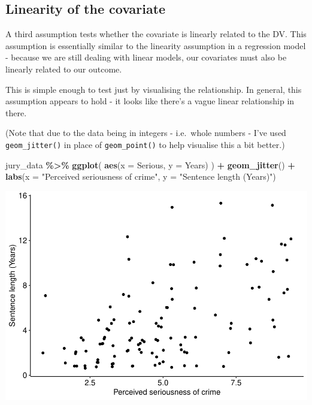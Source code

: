 \documentclass[
]{book}
\newenvironment{Shaded}{\begin{snugshade}}{\end{snugshade}}
\newcommand{\AttributeTok}[1]{\textcolor[rgb]{0.13,0.29,0.53}{#1}}
\newcommand{\FunctionTok}[1]{\textcolor[rgb]{0.13,0.29,0.53}{\textbf{#1}}}
\newcommand{\NormalTok}[1]{#1}
\newcommand{\SpecialCharTok}[1]{\textcolor[rgb]{0.81,0.36,0.00}{\textbf{#1}}}
\newcommand{\StringTok}[1]{\textcolor[rgb]{0.31,0.60,0.02}{#1}}
\begin{document}
\subsection{Linearity of the covariate}\label{linearity-of-the-covariate}

A third assumption tests whether the covariate is linearly related to the DV. This assumption is essentially similar to the linearity assumption in a regression model - because we are still dealing with linear models, our covariates must also be linearly related to our outcome.

This is simple enough to test just by visualising the relationship. In general, this assumption appears to hold - it looks like there's a vague linear relationship in there.

(Note that due to the data being in integers - i.e.~whole numbers - I've used \texttt{geom\_jitter()} in place of \texttt{geom\_point()} to help visualise this a bit better.)

\begin{Shaded}
\begin{Highlighting}[]
\NormalTok{jury\_data }\SpecialCharTok{\%\textgreater{}\%}
  \FunctionTok{ggplot}\NormalTok{(}
    \FunctionTok{aes}\NormalTok{(}\AttributeTok{x =}\NormalTok{ Serious, }\AttributeTok{y =}\NormalTok{ Years)}
\NormalTok{  ) }\SpecialCharTok{+} 
  \FunctionTok{geom\_jitter}\NormalTok{() }\SpecialCharTok{+} 
  \FunctionTok{labs}\NormalTok{(}\AttributeTok{x =} \StringTok{"Perceived seriousness of crime"}\NormalTok{, }\AttributeTok{y =} \StringTok{"Sentence length (Years)"}\NormalTok{)}
\end{Highlighting}
\end{Shaded}

\begin{center}\includegraphics{_main_files/figure-latex/unnamed-chunk-283-1} \end{center}
\end{document}
